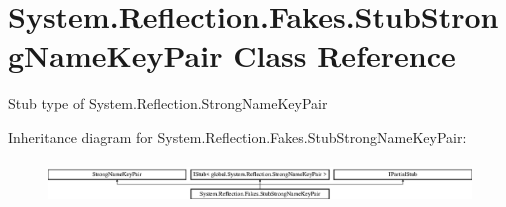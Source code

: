 \hypertarget{class_system_1_1_reflection_1_1_fakes_1_1_stub_strong_name_key_pair}{\section{System.\-Reflection.\-Fakes.\-Stub\-Strong\-Name\-Key\-Pair Class Reference}
\label{class_system_1_1_reflection_1_1_fakes_1_1_stub_strong_name_key_pair}
}


Stub type of System.\-Reflection.\-Strong\-Name\-Key\-Pair 


Inheritance diagram for System.\-Reflection.\-Fakes.\-Stub\-Strong\-Name\-Key\-Pair\-:\begin{figure}[H]
\begin{center}
\leavevmode
\includegraphics[height=1.138211cm]{class_system_1_1_reflection_1_1_fakes_1_1_stub_strong_name_key_pair}
\end{center}
\end{figure}
